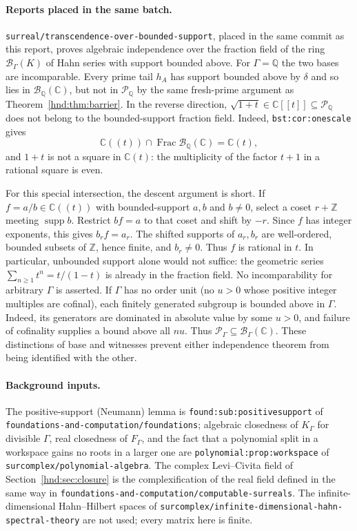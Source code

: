 \documentclass[11pt,oneside]{article}
\theoremstyle{definition}
\theoremstyle{remark}
\newcommand{\C}{\mathbb C}
\newcommand{\Q}{\mathbb Q}
\newcommand{\Z}{\mathbb Z}
\newcommand{\Pfield}{\mathscr P_\Gamma}
\newcommand{\supp}{\operatorname{supp}}
\newcommand{\repo}[1]{\nolinkurl{#1}}%
\newcommand{\lbl}[1]{\nolinkurl{#1}}%
\begin{document}
\paragraph{Reports placed in the same batch.}
\repo{surreal/transcendence-over-bounded-support}, placed in the same
commit as this report, proves algebraic independence over the fraction
field of the ring $\mathcal B_\Gamma(K)$ of Hahn series with support bounded
above. For $\Gamma=\Q$ the two bases are incomparable. Every prime tail $h_A$
has support bounded above by $\delta$ and so lies in
$\mathcal B_\Q(\C)$, but not in $\mathscr P_\Q$ by the same fresh-prime
argument as Theorem~\ref{hnd:thm:barrier}. In the reverse direction,
$\sqrt{1+t}\in\C[[t]]\subseteq\mathscr P_\Q$ does not belong to the
bounded-support fraction field. Indeed, \lbl{bst:cor:onescale} gives
\[
 \C((t))\cap\operatorname{Frac}\mathcal B_\Q(\C)=\C(t),
\]
and $1+t$ is not a square in $\C(t)$: the multiplicity of the factor
$t+1$ in a rational square is even.

For this special intersection, the descent argument is short. If
$f=a/b\in\C((t))$ with bounded-support $a,b$ and $b\ne0$, select a
coset $r+\Z$ meeting $\supp b$. Restrict $bf=a$ to that coset and shift
by $-r$. Since $f$ has integer exponents, this gives $b_r f=a_r$.
The shifted supports of $a_r,b_r$ are well-ordered, bounded subsets of
$\Z$, hence finite, and $b_r\ne0$. Thus $f$ is rational in $t$.
In particular, unbounded support alone would not suffice: the geometric
series $\sum_{n\ge1}t^n=t/(1-t)$ is already in the fraction field.
No incomparability for arbitrary $\Gamma$ is asserted. If $\Gamma$ has
no order unit (no $u>0$ whose positive integer multiples are cofinal),
each finitely generated subgroup is bounded above in $\Gamma$.
Indeed, its generators are dominated in absolute value by some $u>0$,
and failure of cofinality supplies a bound above all $nu$.
Thus $\Pfield\subseteq\mathcal B_\Gamma(\C)$.
These distinctions of base and witnesses prevent either independence
theorem from being identified with the other.

\paragraph{Background inputs.} The positive-support (Neumann) lemma is
\lbl{found:sub:positivesupport} of
\repo{foundations-and-computation/foundations}; algebraic closedness of
$K_\Gamma$ for divisible $\Gamma$, real closedness of $F_\Gamma$, and the
fact that a polynomial split in a workspace gains no roots in a larger one
are \lbl{polynomial:prop:workspace} of \repo{surcomplex/polynomial-algebra}.
The complex Levi--Civita field of Section~\ref{hnd:sec:closure} is the
complexification of the real field defined in the same way in
\repo{foundations-and-computation/computable-surreals}. The
infinite-dimensional Hahn--Hilbert spaces of
\repo{surcomplex/infinite-dimensional-hahn-spectral-theory} are not used;
every matrix here is finite.
\end{document}
